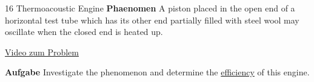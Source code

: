 \documentclass[9pt]{beamer}
\begin{document}
\begin{frame}{16 Thermoacoustic Engine}
\textbf{Phaenomen} A piston placed in the open end of a horizontal test tube which has its other end partially filled with steel wool may oscillate when the closed end is heated up.
\vfill
\begin{center}
\color{blue}\href{https://www.youtube.com/watch?v=ErlvMZI0tlA}{Video zum Problem}\color{black}
\end{center}
\vfill
\textbf{Aufgabe} Investigate the phenomenon and determine the \underline{efficiency} of this engine.
\end{frame}
\end{document}
